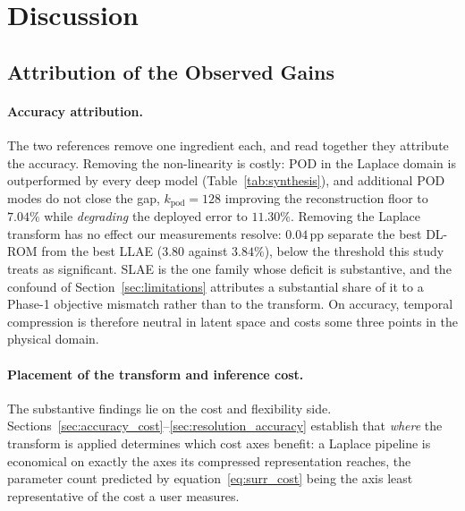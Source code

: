 ﻿\documentclass[a4paper,12pt]{article}
\theoremstyle{definition}
\theoremstyle{remark}
\begin{document}
\section{Discussion}
\label{sec:discussion}

\subsection{Attribution of the Observed Gains}
\label{sec:attribution}

\paragraph{Accuracy attribution.}
The two references remove one ingredient each, and read together they attribute the accuracy. Removing the non-linearity is costly: POD in the Laplace domain is outperformed by every deep model (Table~\ref{tab:synthesis}), and additional POD modes do not close the gap, $k_{\mathrm{pod}} = 128$ improving the reconstruction floor to $7.04\%$ while \emph{degrading} the deployed error to $11.30\%$. Removing the Laplace transform has no effect our measurements resolve: $0.04$\,pp separate the best DL-ROM from the best LLAE ($3.80$ against $3.84\%$), below the threshold this study treats as significant. SLAE is the one family whose deficit is substantive, and the confound of Section~\ref{sec:limitations} attributes a substantial share of it to a Phase-1 objective mismatch rather than to the transform. On accuracy, temporal compression is therefore neutral in latent space and costs some three points in the physical domain.

\paragraph{Placement of the transform and inference cost.}
The substantive findings lie on the cost and flexibility side. Sections~\ref{sec:accuracy_cost}--\ref{sec:resolution_accuracy} establish that \emph{where} the transform is applied determines which cost axes benefit: a Laplace pipeline is economical on exactly the axes its compressed representation reaches, the parameter count predicted by equation~\eqref{eq:surr_cost} being the axis least representative of the cost a user measures.
\end{document}
